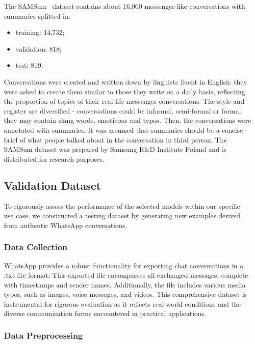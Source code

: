 \documentclass[10pt,twocolumn,letterpaper]{article}
\begin{document}
The SAMSum~\cite{DBLP:journals/corr/abs-1911-12237} dataset contains about 16,000 messenger-like conversations with summaries splitted in:
\begin{itemize}
    \item training: 14,732;
    \item validation: 818;
    \item test: 819.
\end{itemize}
Conversations were created and written down by linguists fluent in English: they were asked to create them similar to those they write on a daily basis, reflecting the proportion of topics of their real-life messenger conversations. 
The style and register are diversified - conversations could be informal, semi-formal or formal, 
they may contain slang words, emoticons and typos. Then, the conversations were annotated with summaries. 
It was assumed that summaries should be a concise brief of what people talked about in the conversation in third person. 
The SAMSum dataset was prepared by Samsung R\&D Institute Poland and is distributed for research purposes.

\subsection{Validation Dataset}

To rigorously assess the performance of the selected models within our specific use case, 
we constructed a testing dataset by generating new examples derived from authentic WhatsApp conversations.

\subsubsection{Data Collection}
WhatsApp provides a robust functionality for exporting chat conversations in a .txt file format. 
This exported file encompasses all exchanged messages, complete with timestamps and sender names. 
Additionally, the file includes various media types, such as images, voice messages, and videos. 
This comprehensive dataset is instrumental for rigorous evaluation as it reflects real-world conditions and the diverse communication forms encountered in practical applications.

\subsubsection{Data Preprocessing}
\end{document}
